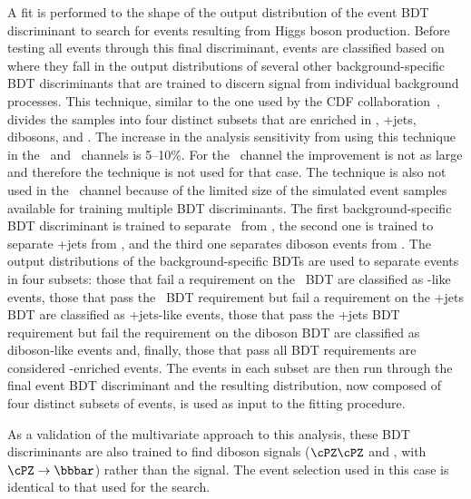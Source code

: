 \documentclass[12pt,twoside,a4paper,cmspaper,final,collab]{cms-tdr}
\begin{document}
A fit is performed to the shape of the output distribution of the event BDT discriminant
to search for events resulting from Higgs boson production. Before testing all
events through this
final discriminant, events are classified based
on where they fall in the output distributions of several other background-specific BDT discriminants
that are trained to discern signal from individual background processes. This
technique, similar to the one used by the CDF collaboration~\cite{Aaltonen:2012id}, divides the samples into four distinct subsets that are
enriched in \ttbar, {\Vvar}+jets, dibosons, and \VH. The increase in the analysis sensitivity from using this technique in the
 \ZnnH\ and \WlnH\ channels is 5--10\%. For the  \ZllH\ channel the
improvement is not as large and therefore the technique is not used for that
 case. The technique is also not used in the \WtnH\ channel because of the
 limited size of the simulated event samples available for training
 multiple BDT discriminants.
The first background-specific BDT discriminant is trained to separate
\ttbar\ from \VH,
the second one is trained to separate {\Vvar}+jets from \VH, and the third one separates diboson events from \VH.
The output distributions of the background-specific BDTs are used to separate
events in four subsets: those that fail a requirement on the \ttbar\ BDT
are classified as \ttbar-like events,
those that pass the \ttbar\ BDT requirement but fail a requirement on the {\Vvar}+jets BDT
are classified as {\Vvar}+jets-like events,
those that pass the {\Vvar}+jets BDT requirement but fail the requirement on the diboson BDT
are classified as diboson-like events
and, finally, those that pass all BDT requirements are considered \VH-enriched events.
The events in each subset are then run through the final event BDT
discriminant and the resulting distribution, now composed of four
distinct subsets of events, is used as input to the fitting procedure.


As a validation of the multivariate approach to this analysis, these
BDT discriminants are also trained to find diboson signals ($\cPZ\cPZ$ and \PW\cPZ, with
$\cPZ\to \bbbar$) rather than the \VH signal. The event selection used in this case is identical
to that used for the \VH search.
\end{document}

